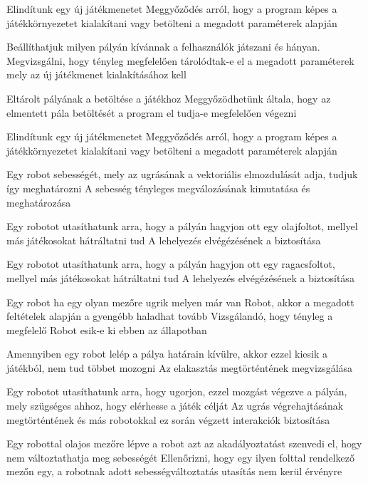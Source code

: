 %
{Elindítunk egy új játékmenetet}%
{Meggyőződés arról, hogy a program képes a játékkörnyezetet kialakítani vagy betölteni a megadott paraméterek alapján}

%
{Beállíthatjuk milyen pályán kívánnak a felhasználók játszani és hányan.}%
{Megvizsgálni, hogy tényleg megfelelően tárolódtak-e el a megadott paraméterek mely az új játékmenet kialakításához kell}

%
{Eltárolt pályának a betöltése a játékhoz}%
{Meggyőzödhetünk általa, hogy az elmentett pála betöltését a program el tudja-e megfelelően végezni}

%
{Elindítunk egy új játékmenetet}%
{Meggyőződés arról, hogy a program képes a játékkörnyezetet kialakítani vagy betölteni a megadott paraméterek alapján}

%
{Egy robot sebességét, mely az ugrásának a vektoriális elmozdulását adja, tudjuk így meghatározni}%
{A sebesség tényleges megválozásának kimutatása és meghatározása}

%
{Egy robotot utasíthatunk arra, hogy a pályán hagyjon ott egy olajfoltot, mellyel más játékosokat hátráltatni tud}%
{A lehelyezés elvégézésének a biztosítása}

%
{Egy robotot utasíthatunk arra, hogy a pályán hagyjon ott egy ragacsfoltot, mellyel más játékosokat hátráltatni tud}%
{A lehelyezés elvégézésének a biztosítása}

%
{Egy robot ha egy olyan mezőre ugrik melyen már van Robot, akkor a megadott feltételek alapján a gyengébb haladhat tovább}%
{Vizsgálandó, hogy tényleg a megfelelő Robot esik-e ki ebben az állapotban}

%
{Amennyiben egy robot lelép a pálya határain kívülre, akkor ezzel kiesik a játékból, nem tud többet mozogni}%
{Az elakasztás megtörténtének megvizsgálása}

%
{Egy robotot utasíthatunk arra, hogy ugorjon, ezzel mozgást végezve a pályán, mely szügséges ahhoz, hogy elérhesse a játék célját}%
{Az ugrás végrehajtásának megtörténtének és más robotokkal ez során végzett interakciók biztosítása}

%
{Egy robottal olajos mezőre lépve a robot azt az akadályoztatást szenvedi el, hogy nem változtathatja meg sebességét}%
{Ellenőrizni, hogy egy ilyen folttal rendelkező mezőn egy, a robotnak adott sebességváltoztatás utasítás nem kerül érvényre}

